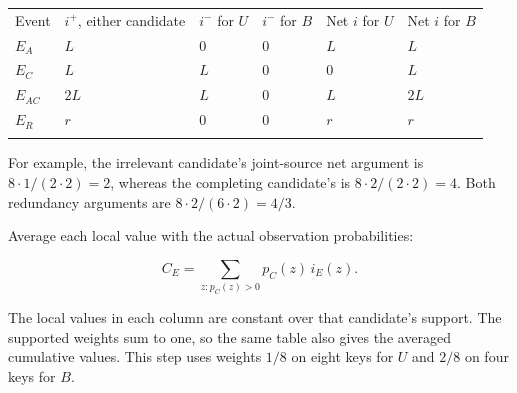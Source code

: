 {\def\LTcaptype{none} %
\begin{longtable}[]{@{}
  >{\raggedright\arraybackslash}p{}
  >{\raggedleft\arraybackslash}p{}
  >{\raggedleft\arraybackslash}p{}
  >{\raggedleft\arraybackslash}p{}
  >{\raggedleft\arraybackslash}p{}
  >{\raggedleft\arraybackslash}p{}@{}}
\toprule\noalign{}
\begin{minipage}[b]{\linewidth}\raggedright
Event
\end{minipage} & \begin{minipage}[b]{\linewidth}\raggedleft
\(i^+\), either candidate
\end{minipage} & \begin{minipage}[b]{\linewidth}\raggedleft
\(i^-\) for \(U\)
\end{minipage} & \begin{minipage}[b]{\linewidth}\raggedleft
\(i^-\) for \(B\)
\end{minipage} & \begin{minipage}[b]{\linewidth}\raggedleft
Net \(i\) for \(U\)
\end{minipage} & \begin{minipage}[b]{\linewidth}\raggedleft
Net \(i\) for \(B\)
\end{minipage} \\*
\midrule\noalign{}
\endhead
\bottomrule\noalign{}
\endfoot
\(E_A\) & \(L\) & \(0\) & \(0\) & \(L\) & \(L\) \\*
\(E_C\) & \(L\) & \(L\) & \(0\) & \(0\) & \(L\) \\*
\(E_{AC}\) & \(2L\) & \(L\) & \(0\) & \(L\) & \(2L\) \\*
\(E_R\) & \(r\) & \(0\) & \(0\) & \(r\) & \(r\) \\*
\end{longtable}
}

For example, the irrelevant candidate's joint-source net argument is \(8\cdot1/(2\cdot2)=2\), whereas the completing candidate's is \(8\cdot2/(2\cdot2)=4\). Both redundancy arguments are \(8\cdot2/(6\cdot2)=4/3\).

Average each local value with the actual observation probabilities:

\[
C_E=\sum_{z:p_C(z)>0}p_C(z)\,i_E(z).
\]

The local values in each column are constant over that candidate's support. The supported weights sum to one, so the same table also gives the averaged cumulative values. This step uses weights \(1/8\) on eight keys for \(U\) and \(2/8\) on four keys for \(B\).

